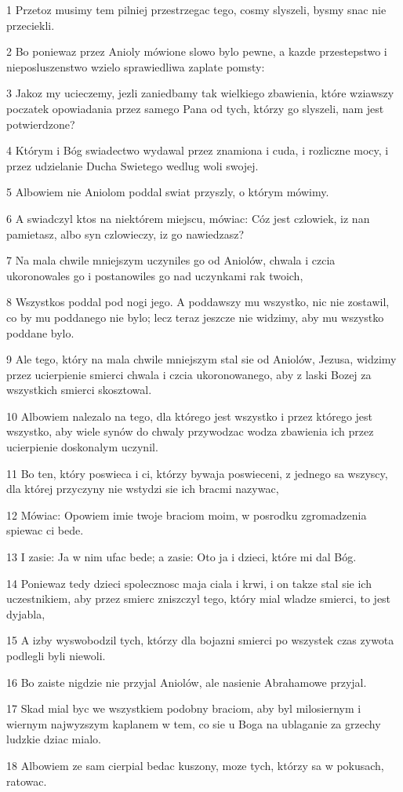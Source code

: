 \par 1 Przetoz musimy tem pilniej przestrzegac tego, cosmy slyszeli, bysmy snac nie przeciekli.
\par 2 Bo poniewaz przez Anioly mówione slowo bylo pewne, a kazde przestepstwo i nieposluszenstwo wzielo sprawiedliwa zaplate pomsty:
\par 3 Jakoz my ucieczemy, jezli zaniedbamy tak wielkiego zbawienia, które wziawszy poczatek opowiadania przez samego Pana od tych, którzy go slyszeli, nam jest potwierdzone?
\par 4 Którym i Bóg swiadectwo wydawal przez znamiona i cuda, i rozliczne mocy, i przez udzielanie Ducha Swietego wedlug woli swojej.
\par 5 Albowiem nie Aniolom poddal swiat przyszly, o którym mówimy.
\par 6 A swiadczyl ktos na niektórem miejscu, mówiac: Cóz jest czlowiek, iz nan pamietasz, albo syn czlowieczy, iz go nawiedzasz?
\par 7 Na mala chwile mniejszym uczyniles go od Aniolów, chwala i czcia ukoronowales go i postanowiles go nad uczynkami rak twoich,
\par 8 Wszystkos poddal pod nogi jego. A poddawszy mu wszystko, nic nie zostawil, co by mu poddanego nie bylo; lecz teraz jeszcze nie widzimy, aby mu wszystko poddane bylo.
\par 9 Ale tego, który na mala chwile mniejszym stal sie od Aniolów, Jezusa, widzimy przez ucierpienie smierci chwala i czcia ukoronowanego, aby z laski Bozej za wszystkich smierci skosztowal.
\par 10 Albowiem nalezalo na tego, dla którego jest wszystko i przez którego jest wszystko, aby wiele synów do chwaly przywodzac wodza zbawienia ich przez ucierpienie doskonalym uczynil.
\par 11 Bo ten, który poswieca i ci, którzy bywaja poswieceni, z jednego sa wszyscy, dla której przyczyny nie wstydzi sie ich bracmi nazywac,
\par 12 Mówiac: Opowiem imie twoje braciom moim, w posrodku zgromadzenia spiewac ci bede.
\par 13 I zasie: Ja w nim ufac bede; a zasie: Oto ja i dzieci, które mi dal Bóg.
\par 14 Poniewaz tedy dzieci spolecznosc maja ciala i krwi, i on takze stal sie ich uczestnikiem, aby przez smierc zniszczyl tego, który mial wladze smierci, to jest dyjabla,
\par 15 A izby wyswobodzil tych, którzy dla bojazni smierci po wszystek czas zywota podlegli byli niewoli.
\par 16 Bo zaiste nigdzie nie przyjal Aniolów, ale nasienie Abrahamowe przyjal.
\par 17 Skad mial byc we wszystkiem podobny braciom, aby byl milosiernym i wiernym najwyzszym kaplanem w tem, co sie u Boga na ublaganie za grzechy ludzkie dziac mialo.
\par 18 Albowiem ze sam cierpial bedac kuszony, moze tych, którzy sa w pokusach, ratowac.

